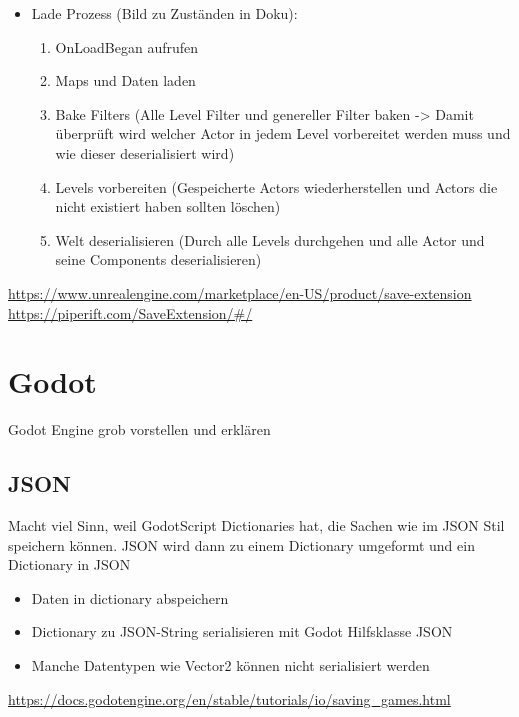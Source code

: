 \begin{itemize}
\begin{enumerate}
    \end{enumerate}
    \item Lade Prozess (Bild zu Zuständen in Doku):
    \begin{enumerate}
        \item OnLoadBegan aufrufen
        \item Maps und Daten laden
        \item Bake Filters (Alle Level Filter und genereller Filter baken -> Damit überprüft wird welcher Actor in jedem Level vorbereitet werden muss und wie dieser deserialisiert wird)
        \item Levels vorbereiten (Gespeicherte Actors wiederherstellen und Actors die nicht existiert haben sollten löschen)
        \item Welt deserialisieren (Durch alle Levels durchgehen und alle Actor und seine Components deserialisieren)
    \end{enumerate}
\end{itemize}

\url{https://www.unrealengine.com/marketplace/en-US/product/save-extension}\\
\url{https://piperift.com/SaveExtension/#/}


\section{Godot}
Godot Engine grob vorstellen und erklären

\subsection{JSON}
Macht viel Sinn, weil GodotScript Dictionaries hat, die Sachen wie im JSON Stil speichern 
können. JSON wird dann zu einem Dictionary umgeformt und ein Dictionary in JSON

\begin{itemize}
    \item Daten in dictionary abspeichern
    \item Dictionary zu JSON-String serialisieren mit Godot Hilfsklasse JSON
    \item Manche Datentypen wie Vector2 können nicht serialisiert werden
\end{itemize}

\url{https://docs.godotengine.org/en/stable/tutorials/io/saving_games.html}\\

